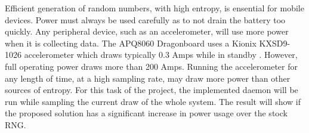 
Efficient generation of random numbers, with high entropy, is ensential 
for mobile devices.  Power must always be used carefully as to not drain 
the battery too quickly.  Any peripheral device, such as an 
accelerometer, will use more power when it is collecting data.  The 
APQ8060 Dragonboard uses a Kionix KXSD9-1026 accelerometer which draws 
typically 0.3 \mu Amps while in standby \cite{Kionix}.  However, full 
operating power draws more than 200 \mu Amps.  Running the accelerometer 
for any length of time, at a high sampling rate, may draw more power 
than other sources of entropy.  For this task of the project, the 
implemented daemon will be run while sampling the current draw of the 
whole system.  The result will show if the proposed solution has a 
significant increase in power usage over the stock RNG.
